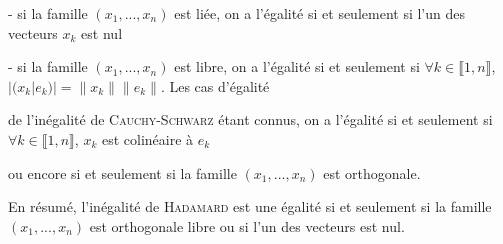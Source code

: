 {{- si la famille $(x_1,...,x_n)$ est liée, on a l'égalité si et seulement si l'un des vecteurs $x_k$ est nul 

- si la famille $(x_1,...,x_n)$ est libre, on a l'égalité si et seulement si $\forall k\in\llbracket1,n\rrbracket$, $|(x_k|e_k)|=\|x_k\|\|e_k\|$. Les cas d'égalité

de l'inégalité de \textsc{Cauchy}-\textsc{Schwarz} étant connus, on a l'égalité si et seulement si $\forall k\in\llbracket1,n\rrbracket$, $x_k$ est colinéaire à $e_k$ 

ou encore si et seulement si la famille $(x_1,...,x_n)$ est orthogonale.

En résumé, l'inégalité de \textsc{Hadamard} est une égalité si et seulement si la famille $(x_1,...,x_n)$ est orthogonale libre ou si l'un des vecteurs est nul.
}
}
